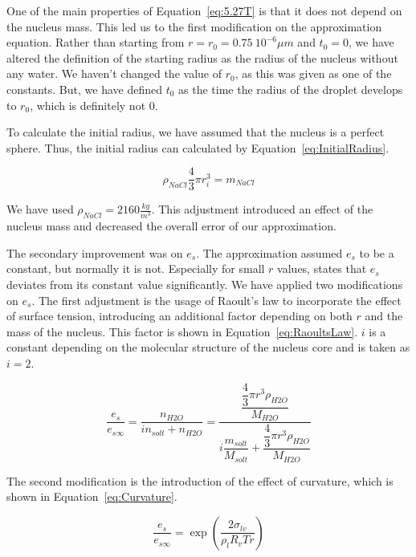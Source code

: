 \documentclass[]{article}
\begin{document}
One of the main properties of Equation~\eqref{eq:5.27T} is that it does not
depend on the nucleus mass. This led us to the first modification on the
approximation equation. Rather than starting from $r=r_{0}=0.75\ 10^{-6} \mu m$
and $t_{0}=0$, we have altered the definition of the starting radius as the
radius of the nucleus without any water. We haven't changed the value of
$r_{0}$, as this was given as one of the constants. But, we have defined
$t_{0}$ as the time the radius of the droplet develops to $r_{0}$, which is
definitely not $0$.

To calculate the initial radius, we have assumed that the nucleus is a perfect
sphere. Thus, the initial radius can calculated by
Equation~\eqref{eq:InitialRadius}.

\begin{equation} \label{eq:InitialRadius}
    \rho_{NaCl}\frac{4}{3}\pi r_{i}^{3}=m_{NaCl}
\end{equation}

We have used $\rho_{NaCl}=2160 \frac{kg}{m^{3}}$. This adjustment introduced an
effect of the nucleus mass and decreased the overall error of our
approximation.

The secondary improvement was on $e_{s}$. The approximation assumed $e_{s}$ to
be a constant, but normally it is not. Especially for small $r$ values,
\cite{Best} states that $e_{s}$ deviates from its constant value significantly.
We have applied two modifications on $e_{s}$. The first adjustment is the usage
of Raoult's law to incorporate the effect of surface tension, introducing an
additional factor depending on both $r$ and the mass of the nucleus. This
factor is shown in Equation~\eqref{eq:RaoultsLaw}. $i$ is a constant depending
on the molecular structure of the nucleus core and is taken as $i=2$.

\begin{equation}
    \label{eq:RaoultsLaw}
    \dfrac{e_{s}}{e_{s\infty}}=\dfrac{n_{H2O}}{i n_{solt}+n_{H2O}}=\dfrac{\dfrac{\dfrac{4}{3}\pi r^{3} \rho_{H2O}}{M_{H2O}}}{i \dfrac{m_{solt}}{M_{solt}} + \dfrac{\dfrac{4}{3}\pi r^{3} \rho_{H2O}}{M_{H2O}}}
\end{equation}

The second modification is the introduction of the effect of curvature, which
is shown in Equation~\eqref{eq:Curvature}.

\begin{equation}
    \label{eq:Curvature}
    \dfrac{e_{s}}{e_{s\infty}}=\exp \left( \dfrac{2\sigma_{lv}}{\rho_{l}R_{v}Tr} \right)
\end{equation}
\end{document}
